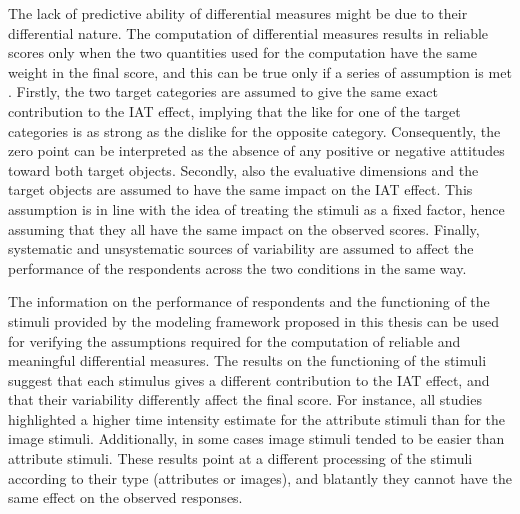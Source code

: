 \documentclass[12pt]{book}
\begin{document}
The lack of predictive ability of differential measures might be due to their differential nature.
The computation of differential measures results in reliable scores only when the two quantities used for the computation have the same weight in the final score, and this can be true only if a series of assumption is met \cite{fiedler2006}.
Firstly, the two target categories are assumed to give the same exact contribution to the IAT effect, implying that the like for one of the target categories is as strong as the dislike for the opposite category. 
Consequently, the zero point can be interpreted as the absence of any positive or negative attitudes toward both target objects. 
Secondly, also the evaluative dimensions and the target objects are assumed to have the same impact on the IAT effect. 
This assumption is in line with the idea of treating the stimuli as a fixed factor, hence assuming that they all have the same impact on the observed scores. 
Finally, systematic and unsystematic sources of variability are assumed to affect the performance of the respondents across the two conditions in the same way.

The information on the performance of respondents and the functioning of the stimuli provided by the modeling framework proposed in this thesis can be used for verifying the assumptions required for the computation of reliable and meaningful differential measures.
The results on the functioning of the stimuli suggest that each stimulus  gives a different contribution to the IAT effect, and that their  variability differently affect the final score. 
For instance, all studies highlighted a higher time intensity estimate for the attribute stimuli than for the image stimuli.  
Additionally, in some cases image stimuli tended to be easier than attribute stimuli. 
These results point at a different processing of the stimuli according to their type (attributes or images), and blatantly they cannot have the same effect on the observed responses.  
\end{document}
